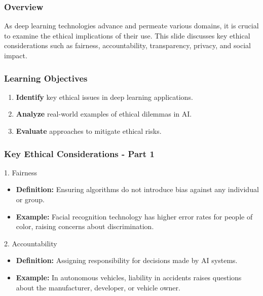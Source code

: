 \documentclass[aspectratio=169]{beamer}
\begin{document}
\begin{frame}[fragile]
    \frametitle{Overview}
    As deep learning technologies advance and permeate various domains, it is crucial to examine the ethical implications of their use. This slide discusses key ethical considerations such as fairness, accountability, transparency, privacy, and social impact.
\end{frame}

\begin{frame}[fragile]
    \frametitle{Learning Objectives}
    \begin{enumerate}
        \item \textbf{Identify} key ethical issues in deep learning applications.
        \item \textbf{Analyze} real-world examples of ethical dilemmas in AI.
        \item \textbf{Evaluate} approaches to mitigate ethical risks.
    \end{enumerate}
\end{frame}

\begin{frame}[fragile]
    \frametitle{Key Ethical Considerations - Part 1}
    \begin{block}{1. Fairness}
        \begin{itemize}
            \item \textbf{Definition:} Ensuring algorithms do not introduce bias against any individual or group.
            \item \textbf{Example:} Facial recognition technology has higher error rates for people of color, raising concerns about discrimination.
        \end{itemize}
    \end{block}

    \begin{block}{2. Accountability}
        \begin{itemize}
            \item \textbf{Definition:} Assigning responsibility for decisions made by AI systems.
            \item \textbf{Example:} In autonomous vehicles, liability in accidents raises questions about the manufacturer, developer, or vehicle owner.
        \end{itemize}
    \end{block}
\end{frame}
\end{document}
